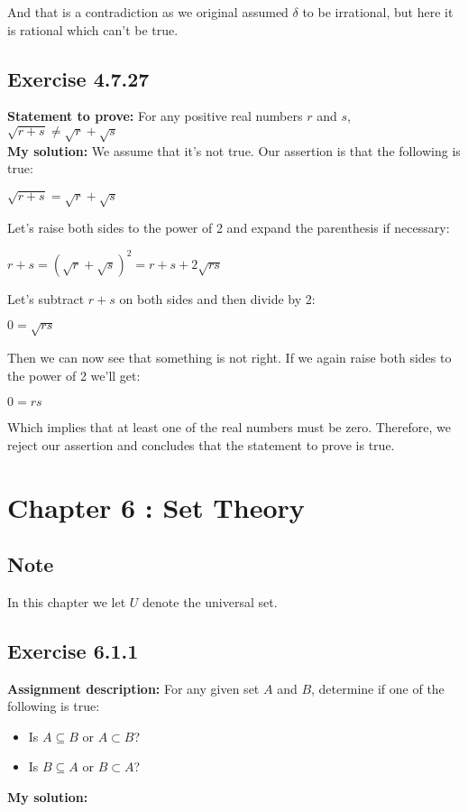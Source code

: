 \documentclass{article}
\newcommand{\cent}[1]{\begin{center}#1\end{center}}
\newcommand{\Prove}{\textbf{Statement to prove: }}
\newcommand{\Assign}{\textbf{Assignment description: }}
\newcommand{\Solution}{\textbf{My solution: }}
\newcommand{\QED}{\boxed{}}
\newcommand{\Chapter}[2]{\section*{Chapter #1 : #2}}
\newcommand{\Exercise}[1]{\subsection*{Exercise #1}}
\begin{document}
	And that is a contradiction as we original assumed $\delta$ to be irrational, but here it is rational which can't be true.\\
	\QED
	
	\Exercise{4.7.27}
	
	\Prove
	For any positive real numbers $r$ and $s$, $\sqrt{r+s} \neq \sqrt{r} + \sqrt{s}$\\
	
	\Solution
	We assume that it's not true. Our assertion is that the following is true:
	
	\cent{$\sqrt{r+s} = \sqrt{r} + \sqrt{s}$}
	
	Let's raise both sides to the power of 2 and expand the parenthesis if necessary:
	
	\cent{$r + s = (\sqrt{r} + \sqrt{s})^{2} = r + s + 2 \sqrt{rs}$}
	
	Let's subtract $r+s$ on both sides and then divide by 2:
	
	\cent{$0 = \sqrt{rs}$}
	
	Then we can now see that something is not right. If we again raise both sides to the power of 2 we'll get:
	
	\cent{$0 = rs$}
	
	Which implies that at least one of the real numbers must be zero. Therefore, we reject our assertion and concludes that the statement to prove is true.\\
	\QED
	\Chapter{6}{Set Theory}
	\subsection*{Note}
	In this chapter we let $U$ denote the universal set.
	
	\Exercise{6.1.1}
	
	\Assign
	For any given set $A$ and $B$, determine if one of the following is true:
	\begin{itemize}
		\item Is $A \subseteq B $ or $A \subset B$?
		\item Is $B \subseteq A$ or $B \subset A$?
	\end{itemize}

	\Solution
	
\end{document}
